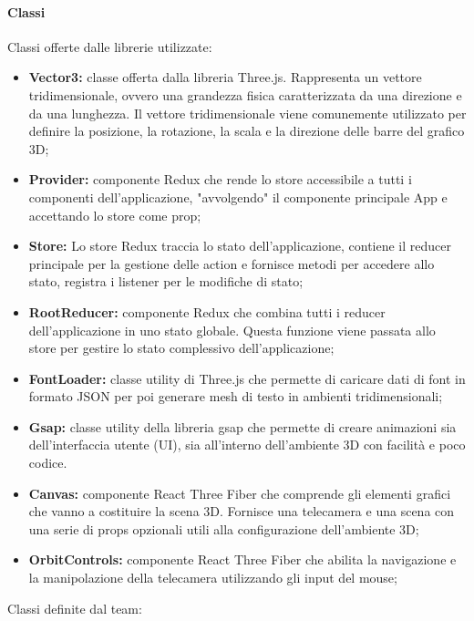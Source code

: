\paragraph{Classi}
Classi offerte dalle librerie utilizzate:
\begin{itemize}
    \item \textbf{Vector3:} classe offerta dalla libreria Three.js. Rappresenta un vettore tridimensionale, ovvero
          una grandezza fisica caratterizzata da una direzione e da una lunghezza. Il vettore tridimensionale
          viene comunemente utilizzato per definire la posizione, la rotazione, la scala e la direzione
          delle barre del grafico 3D;
    \item \textbf{Provider:} componente Redux che rende lo store accessibile a tutti i componenti dell'applicazione, "avvolgendo" il componente principale App e accettando lo store come prop;
    \item \textbf{Store:} Lo store Redux traccia lo stato dell'applicazione, contiene il reducer principale per la gestione delle action e fornisce metodi per accedere allo stato,
          registra i listener per le modifiche di stato;
    \item \textbf{RootReducer:} componente Redux che combina tutti i reducer dell'applicazione in uno stato
          globale. Questa funzione viene passata allo store per gestire lo stato complessivo dell'applicazione;
    \item \textbf{FontLoader:} classe utility di Three.js che permette di caricare dati di font in formato JSON per poi generare mesh di testo in ambienti tridimensionali;
    \item \textbf{Gsap:} classe utility della libreria gsap che permette di creare animazioni sia dell'interfaccia utente (UI), sia all'interno dell'ambiente 3D con facilità e poco codice.
    \item \textbf{Canvas:} componente React Three Fiber che comprende gli elementi grafici che vanno a costituire la scena 3D.
          Fornisce una telecamera e una scena con una serie di props opzionali utili alla configurazione dell'ambiente 3D;
    \item \textbf{OrbitControls:} componente React Three Fiber che abilita la navigazione e la manipolazione della telecamera utilizzando gli input del mouse;
\end{itemize}
Classi definite dal team:
